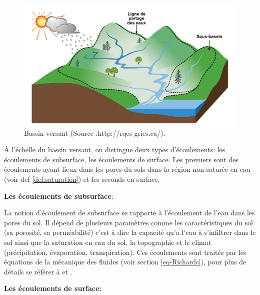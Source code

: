 \documentclass[a4paper,11pt]{article}
\numberwithin{equation}{section}
\begin{document}
\begin{figure}[H]
	\begin{center}
		\includegraphics[scale=0.15]{bassin_versant.png}
	\end{center}
	\caption{Bassin versant (Source :http://rqes-gries.ca/).}
	\label{fig-Bassin versant}
\end{figure}

À l’échelle du bassin versant, on distingue deux types d’écoulements: les écoulements de subsurface, les écoulements de surface. Les premiers sont des écoulements ayant lieux dans les pores du sols dans la région non saturée en eau (voir def \ref{def:saturation}) et les seconds en surface.


\vspace{0.7cm}

\noindent\textbf{Les écoulements de subsurface}:

La notion d'écoulement de subsurface se rapporte à l'écoulement de l'eau dans les pores du sol. Il dépend de plusieurs paramètres comme les caractéristiques du sol (sa porosité, sa perméabilité) c'est à dire la capacité qu'a l'eau à s'infiltrer dans le sol ainsi que la saturation en eau du sol, la topographie et le climat (précipitation, évaporation, transpiration). Ces écoulements sont traités par les équations de la mécanique des fluides (voir section  \ref{eq-Richards}), pour plus de détails se référer à \cite{maquin2016developpement} et \cite{marsily_de1986quantitative}. 

\vspace{0.7cm}

\noindent\textbf{Les écoulements de surface:}
\end{document}
